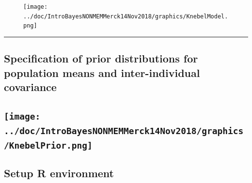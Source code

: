 \documentclass[]{article}
\begin{document}
\begin{figure}[htbp]
\centering
\texttt{[image: ../doc/IntroBayesNONMEMMerck14Nov2018/graphics/KnebelModel.png]}
\caption{}
\end{figure}

\begin{center}\rule{0.5\linewidth}{\linethickness}\end{center}

\subsection{Specification of prior distributions for population means
and inter-individual
covariance}\label{specification-of-prior-distributions-for-population-means-and-inter-individual-covariance}

\subsection{\texorpdfstring{\protect\texttt{[image: ../doc/IntroBayesNONMEMMerck14Nov2018/graphics/KnebelPrior.png]}}{}}\label{section}

\subsection{Setup R environment}\label{setup-r-environment}
\end{document}
